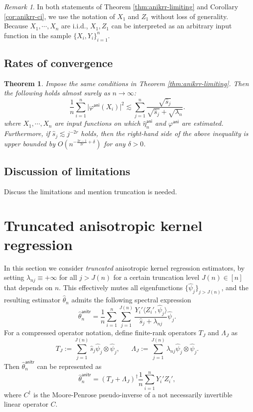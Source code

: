 \documentclass[11pt,a4paper]{article}
\renewcommand{\hat}{\widehat}
\theoremstyle{definition}
\theoremstyle{plain}
\newtheorem{theorem}{Theorem}[section]
\theoremstyle{remark}
\newtheorem{remark}{Remark}[section]
\newcommand{\ani}{\mathsf{ani}}
\newcommand{\anitr}{\mathsf{anitr}}
\begin{document}
\begin{remark}
In both statements of Theorem \ref{thm:anikrr-limiting} and Corollary \ref{cor:anikrr-ci}, we use the notation of $X_1$ and $Z_1$ without loss of generality.
Because $X_1,\cdots,X_n$ are i.i.d., $X_1,Z_1$ can be interpreted as an arbitrary input function in the sample $\{X_i,Y_i\}_{i=1}^n$.
\end{remark}

\subsection{Rates of convergence}

\begin{theorem}
Impose the same conditions in Theorem \ref{thm:anikrr-limiting}. Then the following holds almost surely as $n\to\infty$:
$$
\frac{1}{n}\sum_{i=1}^n \big|\varphi^\ani(X_i)\big|^2 \lesssim \sum_{j=1}^n \frac{\sqrt{\hat s_j}}{\sqrt{\hat s_j}+\sqrt{\lambda_n}}.
$$
where $X_1,\cdots,X_n$ are input functions on which $\hat\eta_n^\ani$ and $\varphi^\ani$ are estimated.
Furthermore, if $\hat s_j\lesssim j^{-2r}$ holds, then the right-hand side of the above inequality is upper bounded by $O(n^{-\frac{2r-1}{2r}+\delta})$
for any $\delta>0$.
\label{thm:anikrr-rates}
\end{theorem}

\subsection{Discussion of limitations}

{\color{red} Discuss the limitations and mention truncation is needed.}

\section{Truncated anisotropic kernel regression}\label{sec:anitr}

In this section we consider \emph{truncated} anisotropic kernel regression estimators, by setting $\lambda_{nj}\equiv +\infty$
for all $j> J(n)$ for a certain truncation level $J(n)\in[n]$ that depends on $n$.
This effectively mutes all eigenfunctions $\{\hat\psi_j\}_{j>J(n)}$, and the resulting estimator $\hat\theta_n$ admits the following spectral expression
\begin{equation}
\hat\theta_n^\anitr = \frac{1}{n}\sum_{i=1}^n\sum_{j=1}^{J(n)}\frac{Y_i'\langle Z_i',\hat\psi_j\rangle}{\hat s_j+\lambda_{nj}}\hat\psi_j.
\label{eq:anitr}
\end{equation}
For a compressed operator notation, define finite-rank operators $T_J$ and $\Lambda_J$ as
$$
T_J := \sum_{j=1}^{J(n)}\hat s_j\hat\psi_j\otimes\hat\psi_j,\;\;\;\;\;\; \Lambda_J := \sum_{j=1}^{J(n)}\lambda_{nj}\hat\psi_j\otimes\hat\psi_j.
$$
Then $\hat\theta_n^\anitr$ can be represented as
$$
\hat\theta_n^\anitr = (T_J+\Lambda_J)^{\dagger}\frac{1}{n}\sum_{i=1}^n Y_i'Z_i',
$$
where $C^\dagger$ is the Moore-Penrose pseudo-inverse of a not necessarily invertible linear operator $C$.
\end{document}

